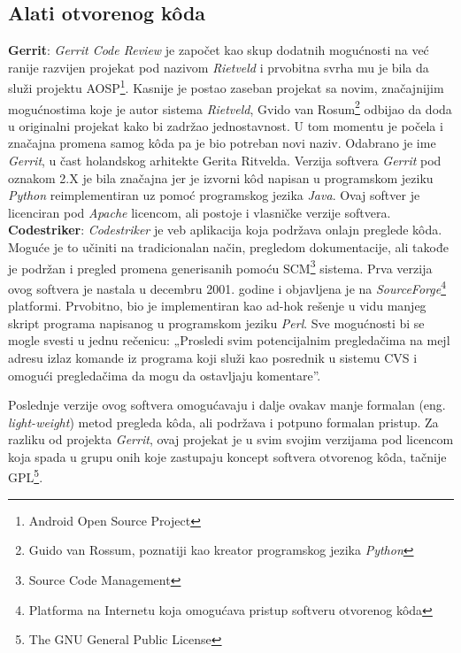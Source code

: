 \documentclass[a4paper]{article}
\begin{document}
\subsection{Alati otvorenog kôda}

\label{Gerrit}
\textbf{Gerrit}: \emph{Gerrit Code Review} je započet kao skup dodatnih mogućnosti 
na već ranije razvijen projekat pod nazivom \emph{Rietveld} i prvobitna svrha mu je bila
da služi projektu AOSP\footnote{Android Open Source Project}. Kasnije je postao zaseban projekat sa novim, značajnijim mogućnostima koje je autor 
sistema \emph{Rietveld}, Gvido van Rosum\footnote{Guido van Rossum, poznatiji kao kreator
programskog jezika \emph{Python}} odbijao da doda u originalni projekat kako bi zadržao jednostavnost.
U tom momentu je počela i značajna promena samog kôda pa je bio potreban novi naziv.
Odabrano je ime \emph{Gerrit}, u čast holandskog arhitekte Gerita Ritvelda. Verzija softvera \emph{Gerrit} pod oznakom 2.X je bila značajna jer je izvorni kôd napisan u programskom jeziku \emph{Python}
reimplementiran uz pomoć programskog jezika \emph{Java}.
\cite{gerrit}
Ovaj softver je licenciran pod \emph{Apache} licencom, ali postoje i vlasničke verzije softvera.
\\

\textbf{Codestriker}: \emph{Codestriker} je veb aplikacija koja podržava onlajn preglede kôda.
Moguće je to učiniti na tradicionalan način, pregledom dokumentacije, ali takođe je podržan i pregled promena generisanih pomoću SCM\footnote{Source Code Management} sistema.
Prva verzija ovog softvera je nastala u decembru 2001. godine i objavljena je na \emph{SourceForge}\footnote{Platforma na Internetu koja omogućava pristup softveru otvorenog kôda}
platformi. Prvobitno, bio je implementiran kao ad-hok rešenje u vidu manjeg skript programa napisanog u programskom jeziku \emph{Perl}.
Sve mogućnosti bi se mogle svesti u jednu rečenicu: „Prosledi svim potencijalnim pregledačima na mejl adresu izlaz komande iz programa koji služi kao posrednik u sistemu CVS i omogući
pregledačima da mogu da ostavljaju komentare”.

Poslednje verzije ovog softvera omogućavaju i dalje ovakav
manje formalan (eng. \emph{light-weight}) metod pregleda kôda, ali 
podržava i potpuno formalan pristup. Za razliku od projekta \emph{Gerrit}, ovaj projekat je u svim svojim verzijama pod licencom
koja spada u grupu onih koje zastupaju koncept softvera otvorenog kôda, tačnije GPL\footnote{The GNU General Public License}.
\\
\end{document}

